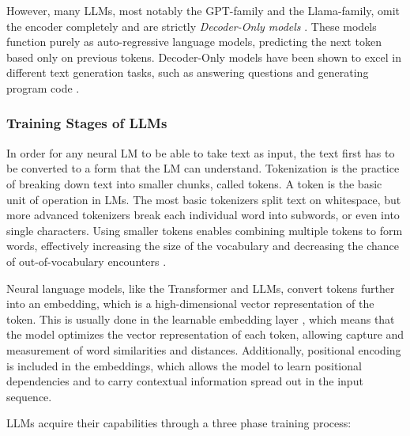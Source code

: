 \documentclass[english, 12pt, a4paper, sci, utf8, a-2b, online]{../definitions/aaltothesis}
\begin{document}
However, many LLMs, most notably the GPT-family and the Llama-family, omit the encoder completely and are strictly \textit{Decoder-Only models} \cite{Minaee2024-fr}. These models function purely as auto-regressive language models, predicting the next token based only on previous tokens. Decoder-Only models have been shown to excel in different text generation tasks, such as answering questions and generating program code \cite{Chen2021EvaluatingLL}.

\subsubsection{Training Stages of LLMs} \label{sec:training}

In order for any neural LM to be able to take text as input, the text first has to be converted to a form that the LM can understand. Tokenization is the practice of breaking down text into smaller chunks, called tokens. A token is the basic unit of operation in LMs. The most basic tokenizers split text on whitespace, but more advanced tokenizers break each individual word into subwords, or even into single characters. Using smaller tokens enables combining multiple tokens to form words, effectively increasing the size of the vocabulary and decreasing the chance of out-of-vocabulary encounters \cite{Minaee2024-fr}.

Neural language models, like the Transformer and LLMs, convert tokens further into an embedding, which is a high-dimensional vector representation of the token. This is usually done in the learnable embedding layer \cite{DBLP:journals/corr/VaswaniSPUJGKP17}, which means that the model optimizes the vector representation of each token, allowing capture and measurement of word similarities and distances. Additionally, positional encoding is included in the embeddings, which allows the model to learn positional dependencies and to carry contextual information spread out in the input sequence.

LLMs acquire their capabilities through a three phase training process:
\end{document}
